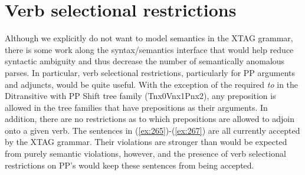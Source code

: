  
 
 
 
\section{Verb selectional restrictions} 
 
Although we explicitly do not want to model semantics in the XTAG grammar, 
there is some work along the syntax/semantics interface that would help reduce 
syntactic ambiguity and thus decrease the number of semantically anomalous 
parses.  In particular, verb selectional restrictions, particularly for PP 
arguments and adjuncts, would be quite useful.  With the exception of the 
required {\it to} in the Ditransitive with PP Shift tree family (Tnx0Vnx1Pnx2), 
any preposition is allowed in the tree families that have prepositions as their 
arguments.  In addition, there are no restrictions as to which prepositions are 
allowed to adjoin onto a given verb.  The sentences in (\ref{ex:265})-(\ref{ex:267}) are 
all currently accepted by the XTAG grammar.  Their violations are stronger than 
would be expected from purely semantic violations, however, and the presence of 
verb selectional restrictions on PP's would keep these sentences from being 
accepted. 
 
\beginsentences
{}\label{ex:265} 
\label{ex:266} 
\label{ex:267} 
\endsentences

